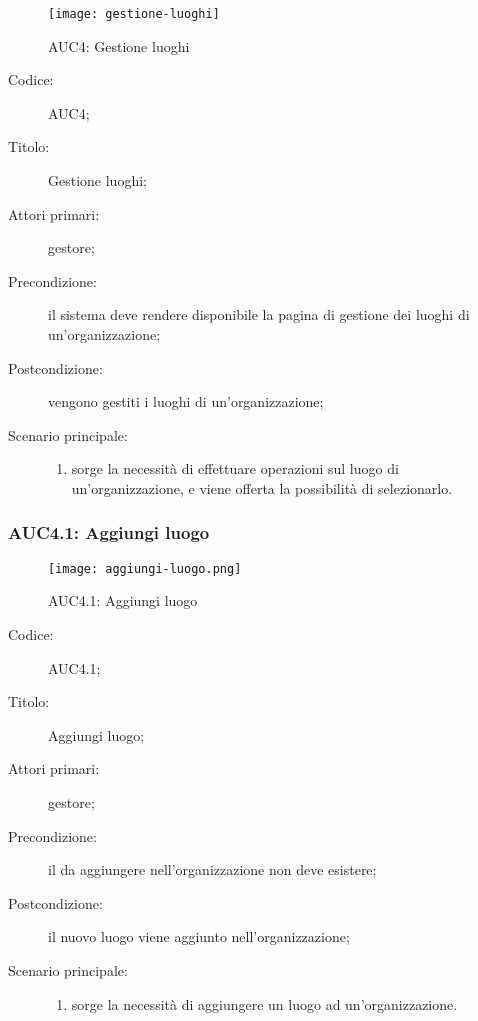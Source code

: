 
\begin{figure}[H]
  \centering
  \texttt{[image: gestione-luoghi]}
  \caption{AUC4: Gestione luoghi}%
  \label{fig:AUC4}
\end{figure}

\begin{description}
  \item[Codice:] AUC4;
  \item[Titolo:] Gestione luoghi;
  \item[Attori primari:] gestore;
  \item[Precondizione:] il sistema deve rendere disponibile la pagina di gestione dei luoghi di un'organizzazione;
  \item[Postcondizione:] vengono gestiti i luoghi di un'organizzazione;
  \item[Scenario principale:]
  \begin{enumerate}
    \item sorge la necessità di effettuare operazioni sul luogo di un'organizzazione, e viene offerta la possibilità di selezionarlo.
  \end{enumerate}
\end{description}

\subsubsection{AUC4.1: Aggiungi luogo}%
\label{subs:AUC4.1}

\begin{figure}[H]
  \centering
  \texttt{[image: aggiungi-luogo.png]}
  \caption{AUC4.1: Aggiungi luogo}%
  \label{fig:AUC4.1}
\end{figure}

\begin{description}
  \item[Codice:] AUC4.1;
  \item[Titolo:] Aggiungi luogo;
  \item[Attori primari:] gestore;
  \item[Precondizione:] il  da aggiungere nell'organizzazione non deve esistere;
  \item[Postcondizione:] il nuovo luogo viene aggiunto nell'organizzazione;
  \item[Scenario principale:]
  \begin{enumerate}
    \item sorge la necessità di aggiungere un luogo ad un'organizzazione.
  \end{enumerate}
\end{description}


